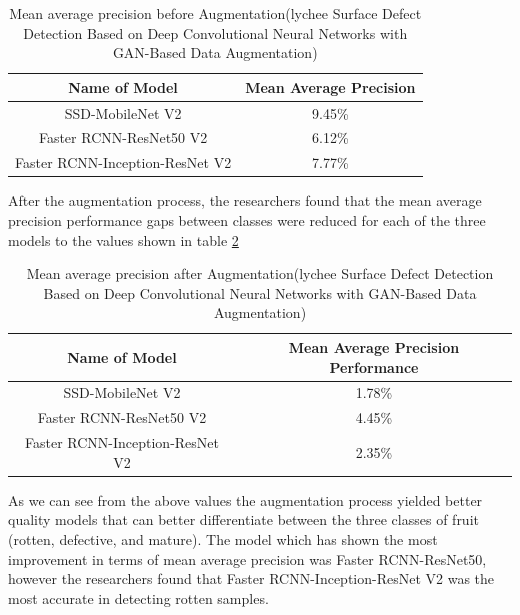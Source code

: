 \begin{table}[H]
    \centering
    {\begin{tabular}{|c|c|}
         \hline
         Name of Model
         & Mean Average Precision\\
         \hline
         SSD-MobileNet V2 & 9.45\%\\
         Faster RCNN-ResNet50 V2 & 6.12\%\\
         Faster RCNN-Inception-ResNet V2 & 7.77\%\\
         \hline
        \end{tabular}}
    \caption{Mean average precision before Augmentation(lychee Surface Defect Detection Based on Deep Convolutional
Neural Networks with GAN-Based Data Augmentation)\cite{litReviewLychee}}
    \label{tab: Mean average precision before Augmentation Lychee}
\end{table}
After the augmentation process, the researchers found that the mean average precision performance gaps between classes were reduced for each of the three models to the values shown in table \ref{tab: Mean average precision after Augmentation Lychee}
\begin{table}[H]
    \centering
    {\begin{tabular}{|c|c|}
         \hline
         Name of Model
         & Mean Average Precision Performance\\
         \hline
         SSD-MobileNet V2 & 1.78\%\\
         Faster RCNN-ResNet50 V2 & 4.45\%\\
         Faster RCNN-Inception-ResNet V2 &  2.35\%\\
         \hline
        \end{tabular}}
    \caption{Mean average precision after Augmentation(lychee Surface Defect Detection Based on Deep Convolutional
Neural Networks with GAN-Based Data Augmentation)\cite{litReviewLychee}}
    \label{tab: Mean average precision after Augmentation Lychee}
\end{table}
As we can see from the above values the augmentation process yielded better quality models that can better differentiate between the three classes of fruit (rotten, defective, and mature).  The model which has shown the most improvement in terms of mean average precision was Faster RCNN-ResNet50, however the researchers found that Faster
RCNN-Inception-ResNet V2 was the most accurate in detecting rotten samples.
